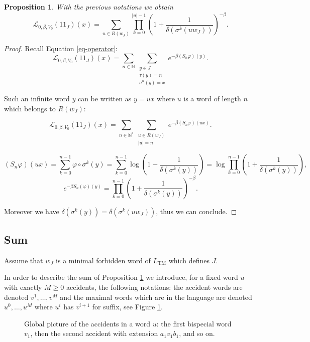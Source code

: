 \documentclass[11 pt]{article}
\newtheorem{proposition}{Proposition}
\newcommand{\BBone}{{1\!\!1}}
\theoremstyle{definition}
\begin{document}
\begin{proposition}\label{prop-operateur-prod-mot}
With the previous notations we obtain
$$\mathcal{L}_{0,\beta,V_0}(\BBone_J)(x)= \sum_{u\in R(w_J)}\prod_{k=0}^{|u|-1}(1+\frac{1}{\delta(\sigma^k(uw_J))})^{-\beta}.$$
\end{proposition}
\begin{proof}
Recall Equation \eqref{eq-operator}:
$$\mathcal{L}_{0,\beta,V_0}(\BBone_J)(x)=\displaystyle\sum_{n\in\mathbb{N}}\sum_{\substack{y\in J\\ \tau(y)=n\\ \sigma^n(y)=x}}e^{-\beta (S_n\varphi)(y)}.$$

Such an infinite word $y$ can be written as $y=ux$ where $u$ is a word of length $n$ which belongs to $R(w_J)$:

$$\mathcal{L}_{0,\beta,V_0}(\BBone_J)(x)=\displaystyle\sum_{n\in\mathbb{N}^*}\sum_{\substack{u\in R(w_J)\\ |u|=n}}e^{-\beta(S_n\varphi)(ux)}.$$

$$(S_n\varphi)(ux)=\displaystyle\sum_{k=0}^{n-1}\varphi\circ \sigma^k(y)=\displaystyle\sum_{k=0}^{n-1}\log(1+\frac{1}{\delta(\sigma^k(y))})=\log\prod_{k=0}^{n-1}(1+\frac{1}{\delta(\sigma^k(y))}),$$
$$e^{-\beta S_n(\varphi)(y)}=\prod_{k=0}^{n-1}(1+\frac{1}{\delta(\sigma^k(y))})^{-\beta}.$$

Moreover we have $\delta(\sigma^k(y))=\delta(\sigma^k(uw_J))$, thus we can conclude. 
\end{proof}





\subsection{Sum}
Assume that $w_J$ is a minimal forbidden word of $L_{\mathrm{TM}}$ which defines $J$.

In order to describe the sum of Proposition \ref{prop-operateur-prod-mot} we introduce, for a fixed word $u$ with exactly $M\geq 0$ accidents, the following notations: the accident words are denoted $v^1,\dots, v^M$ and the maximal words which are in the language are denoted $u^0,\dots, u^M$ where $u^i$ has $v^{i+1}$ for suffix, see Figure \ref{fig:suite-accidents}.




\begin{figure}
\caption{Global picture of the accidents in a word $u$: the first bispecial word $v_1$, then the second accident with extension $a_1v_1b_1$, and so on.}\label{fig:suite-accidents}
\end{figure}
\end{document}
